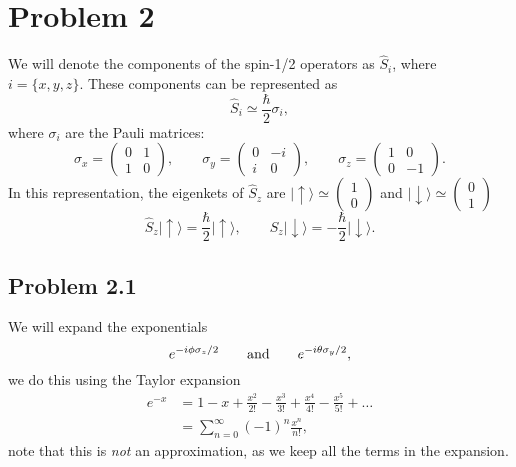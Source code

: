 \documentclass[a4paper, 11pt, titlepage, english]{article}
\newcommand{\op}[1]{\hat{#1}}
\newcommand{\up}{\left|\uparrow\rangle\right.}
\newcommand{\down}{\left|\downarrow\rangle\right.}
\begin{document}
\clearpage
\section*{Problem 2}
We will denote the components of the spin-1/2 operators as $\op{S}_i$, where \mbox{$i = \{x, y, z\}$}. These components can be represented as
$$\op{S}_i \simeq \frac{\hbar}{2}\sigma_i,$$
where $\sigma_i$ are the Pauli matrices:
$$\sigma_x = \begin{pmatrix}
0 & 1 \\ 1 & 0 
\end{pmatrix}, \qquad \sigma_y = \begin{pmatrix}
0 & -i \\ i & 0 
\end{pmatrix}, \qquad
\sigma_z = \begin{pmatrix}
1 & 0 \\ 0 & -1
\end{pmatrix}.$$
In this representation, the eigenkets of $\op{S}_z$ are $\up\simeq\begin{pmatrix}
1 \\ 0
\end{pmatrix}$ and $\down\simeq\begin{pmatrix}
0 \\ 1
\end{pmatrix}$
$$\op{S}_z\up = \frac{\hbar}{2}\up, \qquad \op{S}_z\down = -\frac{\hbar}{2}\down.$$

\subsection*{Problem 2.1}
We will expand the exponentials
$$e^{-i\phi\sigma_z/2} \qquad {\rm and} \qquad e^{-i\theta\sigma_y/2},$$
we do this using the Taylor expansion
\begin{align*}
e^{-x} &= 1 - x + \frac{x^2}{2!} - \frac{x^3}{3!} + \frac{x^4}{4!} - \frac{x^5}{5!} + \ldots \\
&= \sum_{n=0}^\infty (-1)^n \frac{x^n}{n!},
\end{align*}
note that this is \emph{not} an approximation, as we keep all the terms in the expansion.
\end{document}
